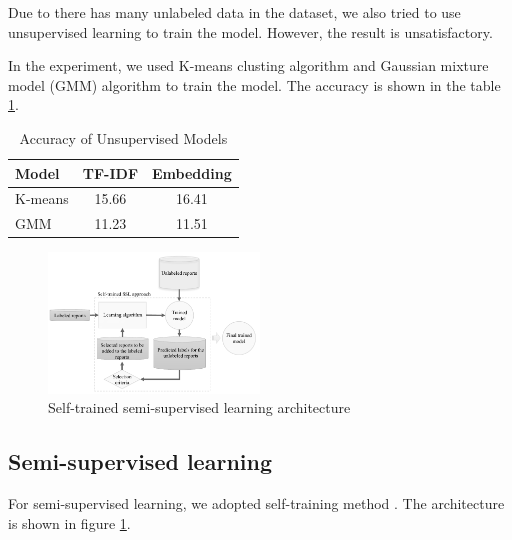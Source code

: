\documentclass[11pt]{article}
\begin{document}
Due to there has many unlabeled data in the dataset,
we also tried to use unsupervised learning to train the model.
However, the result is unsatisfactory.

In the experiment, we used K-means clusting algorithm and Gaussian mixture model (GMM) algorithm to train the model.
The accuracy is shown in the table \ref{tab:unsupervised_results}.

\begin{table}[h!]
    \centering
    \caption{Accuracy of Unsupervised Models}
    \label{tab:unsupervised_results}
    \begin{tabular}{lcc}
    \toprule
    \textbf{Model} & \textbf{TF-IDF} & \textbf{Embedding} \\
    \midrule
    K-means & 15.66 & 16.41 \\
    GMM     & 11.23 & 11.51 \\
    \bottomrule
    \end{tabular}
\end{table}

\begin{figure}[t]
    \centering
    \includegraphics[width=0.5\textwidth]{Self-trained-semi-supervised-learning-architecture.png}
    \caption{Self-trained semi-supervised learning architecture \cite{Self-trained-semi-supervised-learning}}
    \label{fig:Self-trained}
\end{figure}

\subsection{Semi-supervised learning}

For semi-supervised learning, we adopted self-training method \cite{Self-trained-semi-supervised-learning}.
The architecture is shown in figure \ref{fig:Self-trained}.
\end{document}
